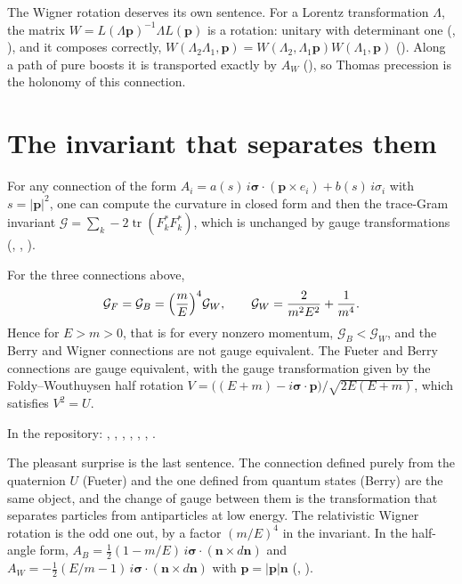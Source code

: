The Wigner rotation deserves its own sentence. For a Lorentz transformation $\Lambda$, the matrix $W=L(\Lambda\mathbf p)^{-1}\Lambda L(\mathbf p)$ is a rotation: unitary with determinant one (, ), and it composes correctly, $W(\Lambda_2\Lambda_1,\mathbf p)=W(\Lambda_2,\Lambda_1\mathbf p)W(\Lambda_1,\mathbf p)$ (). Along a path of pure boosts it is transported exactly by $A_W$ (), so Thomas precession is the holonomy of this connection.

\section{The invariant that separates them}

For any connection of the form $A_i=a(s)\,i\boldsymbol\sigma\cdot(\mathbf p\times e_i)+b(s)\,i\sigma_i$ with $s=|\mathbf p|^2$, one can compute the curvature in closed form and then the trace-Gram invariant $\mathcal G=\sum_k-2\operatorname{tr}(F_k^*F_k^*)$, which is unchanged by gauge transformations (, , ).

\begin{theorem}\proved\label{thm:aw}
For the three connections above,
\[
\mathcal G_F=\mathcal G_B=\Bigl(\frac mE\Bigr)^4\mathcal G_W ,\qquad \mathcal G_W=\frac{2}{m^2E^2}+\frac1{m^4}.
\]
Hence for $E>m>0$, that is for every nonzero momentum, $\mathcal G_B<\mathcal G_W$, and the Berry and Wigner connections are not gauge equivalent. The Fueter and Berry connections are gauge equivalent, with the gauge transformation given by the Foldy--Wouthuysen half rotation $V=\bigl((E+m)-i\boldsymbol\sigma\cdot\mathbf p\bigr)/\sqrt{2E(E+m)}$, which satisfies $V^2=U$.
\end{theorem}
\noindent In the repository: , , , , , , .

The pleasant surprise is the last sentence. The connection defined purely from the quaternion $U$ (Fueter) and the one defined from quantum states (Berry) are the same object, and the change of gauge between them is the transformation that separates particles from antiparticles at low energy. The relativistic Wigner rotation is the odd one out, by a factor $(m/E)^4$ in the invariant. In the half-angle form, $A_B=\tfrac12(1-m/E)\,i\boldsymbol\sigma\cdot(\mathbf n\times d\mathbf n)$ and $A_W=-\tfrac12(E/m-1)\,i\boldsymbol\sigma\cdot(\mathbf n\times d\mathbf n)$ with $\mathbf p=|\mathbf p|\mathbf n$ (, ).

